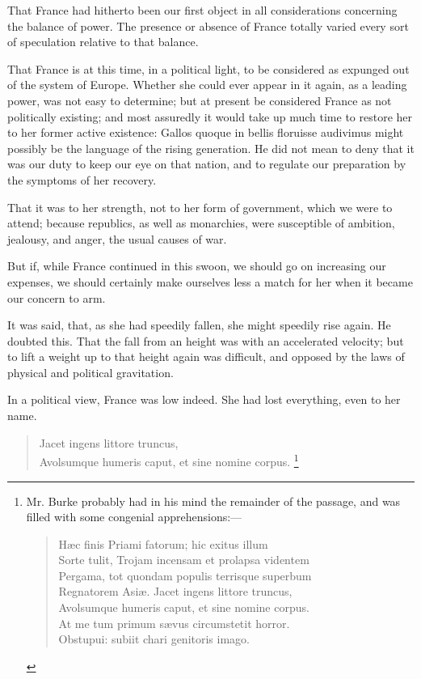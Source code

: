 That France had hitherto been our first object in all considerations concerning the balance of power. The presence or absence of France totally varied every sort of speculation relative to that balance.

That France is at this time, in a political light, to be considered as expunged out of the system of Europe. Whether she could ever appear in it again, as a leading power, was not easy to determine; but at present be considered France as not politically existing; and most assuredly it would take up much time to restore her to her former active existence: Gallos quoque in bellis floruisse audivimus might possibly be the language of the rising generation. He did not mean to deny that it was our duty to keep our eye on that nation, and to regulate our preparation by the symptoms of her recovery.

That it was to her strength, not to her form of government, which we were to attend; because republics, as well as monarchies, were susceptible of ambition, jealousy, and anger, the usual causes of war.

But if, while France continued in this swoon, we should go on increasing our expenses, we should certainly make ourselves less a match for her when it became our concern to arm.

It was said, that, as she had speedily fallen, she might speedily rise again. He doubted this. That the fall from an height was with an accelerated velocity; but to lift a weight up to that height again was difficult, and opposed by the laws of physical and political gravitation.

In a political view, France was low indeed. She had lost everything, even to her name.

\begin{verse}
Jacet ingens littore truncus, \\
Avolsumque humeris caput, et sine nomine corpus. 
\footnote{ 
Mr. Burke probably had in his mind the remainder of the passage, and was filled with some congenial apprehensions:—

\begin{verse}
Hæc finis Priami fatorum; hic exitus illum\\
Sorte tulit, Trojam incensam et prolapsa videntem\\
Pergama, tot quondam populis terrisque superbum\\
Regnatorem Asiæ. Jacet ingens littore truncus,\\
Avolsumque humeris caput, et sine nomine corpus.\\
At me tum primum sævus circumstetit horror.\\
Obstupui: subiit chari genitoris imago.
\end{verse}
}

\end{verse}

